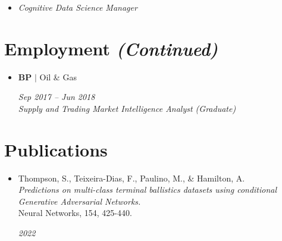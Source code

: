 \documentclass[letterpaper,11pt]{article}
\begin{document}
\begin{itemize}[leftmargin=0.15in, label={}]
    \item
    \textit{\small Cognitive Data Science Manager}
    \vspace{-7pt}
    \vspace{0.2cm}

\end{itemize}

\section{Employment \textit{(Continued)}}
\begin{itemize}[leftmargin=0.15in, label={}]
    \item
    \begin{minipage}[t]{0.75\linewidth}
        \textbf{BP} $|$ Oil \& Gas \\
    \end{minipage} \hfill \textit{\small Sep 2017 -- Jun 2018} \\
    \vspace{-7pt}
    \textit{\small Supply and Trading Market Intelligence Analyst (Graduate)}
    \vspace{-7pt}\vspace{0.2cm}
\end{itemize}

\section{Publications}
\begin{itemize}[leftmargin=0.2in, label={}]
    \item 
        \begin{minipage}[t]{0.75\linewidth}
            Thompson, S., Teixeira-Dias, F., Paulino, M., \& Hamilton, A. \\
            \textit{Predictions on multi-class terminal ballistics datasets using conditional Generative Adversarial Networks.} \\
            Neural Networks, 154, 425-440.
        \end{minipage} \hfill \textit{2022}
\end{itemize}
\end{document}
